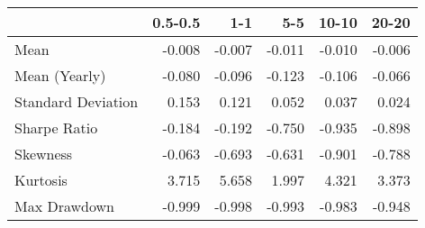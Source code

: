 \begin{tabular}{lrrrrr}
\toprule
{} &  0.5-0.5 &    1-1 &    5-5 &  10-10 &  20-20 \\
\midrule
Mean               &   -0.008 & -0.007 & -0.011 & -0.010 & -0.006 \\
Mean (Yearly)      &   -0.080 & -0.096 & -0.123 & -0.106 & -0.066 \\
Standard Deviation &    0.153 &  0.121 &  0.052 &  0.037 &  0.024 \\
Sharpe Ratio       &   -0.184 & -0.192 & -0.750 & -0.935 & -0.898 \\
Skewness           &   -0.063 & -0.693 & -0.631 & -0.901 & -0.788 \\
Kurtosis           &    3.715 &  5.658 &  1.997 &  4.321 &  3.373 \\
Max Drawdown       &   -0.999 & -0.998 & -0.993 & -0.983 & -0.948 \\
\bottomrule
\end{tabular}
